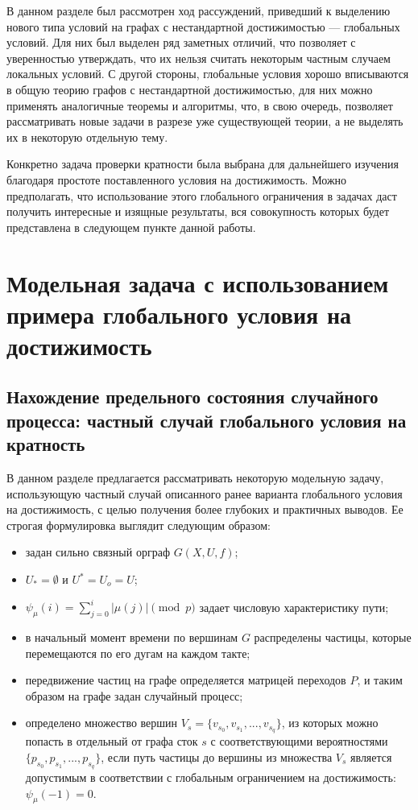 В данном разделе был рассмотрен ход рассуждений, приведший к выделению нового типа условий на графах с нестандартной достижимостью --- глобальных условий. Для них был выделен ряд заметных отличий, что позволяет с уверенностью утверждать, что их нельзя считать некоторым частным случаем локальных условий. С другой стороны, глобальные условия хорошо вписываются в общую теорию графов с нестандартной достижимостью, для них можно применять аналогичные теоремы и алгоритмы, что, в свою очередь, позволяет рассматривать новые задачи в разрезе уже существующей теории, а не выделять их в некоторую отдельную тему. 

Конкретно задача проверки кратности была выбрана для дальнейшего изучения благодаря простоте поставленного условия на достижимость. Можно предполагать, что использование этого глобального ограничения в задачах даст получить интересные и изящные результаты, вся совокупность которых будет представлена в следующем пункте данной работы. 

\chapter{Модельная задача с использованием примера глобального условия на достижимость}

\section{Нахождение предельного состояния случайного процесса: частный случай глобального условия на кратность}

В данном разделе предлагается рассматривать некоторую модельную задачу, использующую частный случай описанного ранее варианта глобального условия на достижимость, с целью получения более глубоких и практичных выводов. Ее строгая формулировка выглядит следующим образом:

\begin{itemize}
	\item задан сильно связный орграф $G(X,U,f)$;
	
	\item $U_* = \emptyset$ и $U^* = U_o = U$;
	
	\item $\psi_\mu(i) = \sum\limits_{j=0}^i | \mu(j)|\pmod p$ задает числовую характеристику пути; 
	
	\item в начальный момент времени по вершинам $G$ распределены частицы, которые перемещаются по его дугам на каждом такте;
	
	\item передвижение частиц на графе определяется матрицей переходов $P$, и таким образом на графе задан случайный процесс;
	
	\item определено множество вершин $V_s = \{v_{s_0}, v_{s_1}, ... , v_{s_q}\}$, из которых можно попасть в отдельный от графа сток $s$ с соответствующими вероятностями $\{p_{s_0}, p_{s_1}, ... , p_{s_q}\}$, если путь частицы до вершины из множества $V_s$ является допустимым в соответствии с глобальным ограничением на достижимость: $\psi_\mu(-1) = 0$.
\end{itemize}

